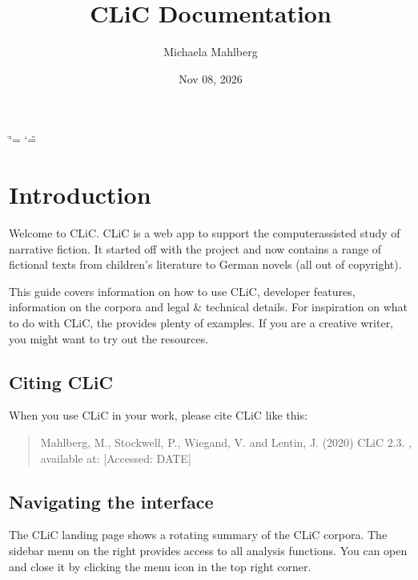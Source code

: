 \documentclass[letterpaper,10pt,english]{sphinxmanual}
\title{CLiC Documentation}
\date{Nov 08, 2026}
\author{Michaela Mahlberg}
\newcommand{\sphinxcontribyoutube}[3]{\begin{quote}\begin{center}\fbox{\url{#1#2#3}}\end{center}\end{quote}}
\begin{document}
\ifdefined\shorthandoff
  \ifnum\catcode`\=\string=\active\shorthandoff{=}\fi
  \ifnum\catcode`\"=\active{}\fi
\fi

\pagestyle{empty}
\sphinxmaketitle
\pagestyle{plain}
\sphinxtableofcontents
\pagestyle{normal}
\label{\detokenize{index::doc}}


\sphinxstepscope


\chapter{Introduction}
\label{\detokenize{introduction:introduction}}\label{\detokenize{introduction::doc}}
\sphinxAtStartPar
Welcome to CLiC. CLiC is a web app to support the computer\sphinxhyphen{}assisted
study of narrative fiction. It started off with the
project and now contains a range of fictional texts from children’s
literature to German novels (all out of copyright).
\sphinxcontribyoutube{https://youtu.be/}{yv6OP3W2NDE}{}

\sphinxAtStartPar
This guide covers information on how to use CLiC, developer features,
information on the corpora and legal \& technical details. For inspiration
on what to do with CLiC, the
 provides plenty
of examples. If you are a creative writer, you might want to try out the
resources.


\section{Citing CLiC}
\label{\detokenize{introduction:citing-clic}}\label{\detokenize{introduction:id1}}
\sphinxAtStartPar
When you use CLiC in your work, please cite CLiC like this:
\begin{quote}

\sphinxAtStartPar
Mahlberg, M., Stockwell, P., Wiegand, V. and Lentin, J. (2020)
CLiC 2.3. , available at:
 {[}Accessed: DATE{]}
\end{quote}


\section{Navigating the interface}
\label{\detokenize{introduction:navigating-the-interface}}\label{\detokenize{introduction:id2}}
\sphinxAtStartPar
The CLiC landing page shows a rotating summary of the CLiC corpora.
The sidebar menu on the right provides access to all analysis functions.
You can open and close it by clicking the menu icon in the top right
corner.
\end{document}
